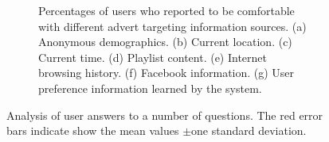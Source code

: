 \begin{figure}[h!]
\begin{subfigure}[t]{0.49\textwidth}
			\caption{Percentages of users who reported to be comfortable with different advert targeting information sources. (a) Anonymous demographics. (b) Current location. (c) Current time. (d) Playlist content. (e) Internet browsing history. (f) Facebook information. (g) User preference information learned by the system.}
		\end{subfigure}
		\caption{Analysis of user answers to a number of questions. The red error bars indicate show the mean values $\pm$one standard deviation.}
		\label{fig:qualitative_results}
	\end{figure}





